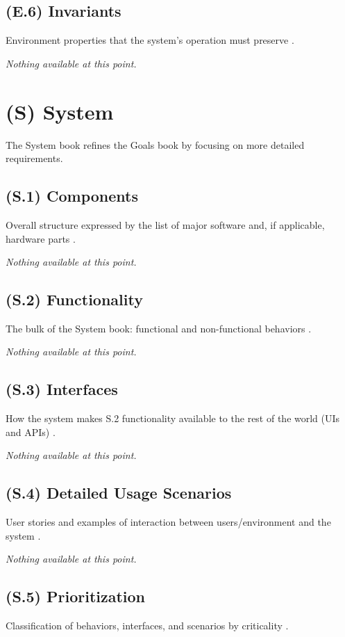\documentclass[12pt,letterpaper]{article}
\begin{document}
\subsection{(E.6) Invariants}
Environment properties that the system’s operation must preserve \cite{meyer2022}.

\textit{Nothing available at this point.}

\clearpage

\section{(S) System}
The System book refines the Goals book by focusing on more detailed requirements.

\subsection{(S.1) Components}
Overall structure expressed by the list of major software and, if applicable, hardware parts \cite{meyer2022}.

\textit{Nothing available at this point.}

\subsection{(S.2) Functionality}
The bulk of the System book: functional and non-functional behaviors \cite{meyer2022}.

\textit{Nothing available at this point.}

\subsection{(S.3) Interfaces}
How the system makes S.2 functionality available to the rest of the world (UIs and APIs) \cite{meyer2022}.

\textit{Nothing available at this point.}

\subsection{(S.4) Detailed Usage Scenarios}
User stories and examples of interaction between users/environment and the system \cite{meyer2022}.

\textit{Nothing available at this point.}

\subsection{(S.5) Prioritization}
Classification of behaviors, interfaces, and scenarios by criticality \cite{meyer2022}.
\end{document}
